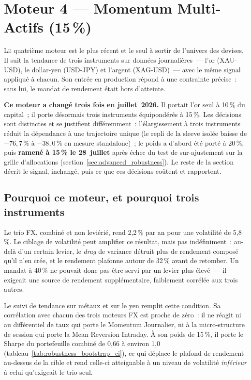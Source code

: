 \section{Moteur 4 --- Momentum Multi-Actifs (15\,\%)}
\label{sec:gold_momentum}

\lettrine[lines=2, findent=2pt, nindent=0pt]{L}{e} quatrième moteur est le plus récent et le seul à sortir de l'univers des devises. Il suit la tendance de trois instruments sur données journalières~--- l'or (XAU-USD), le dollar-yen (USD-JPY) et l'argent (XAG-USD)~--- avec le même signal appliqué à chacun. Son entrée en production répond à une contrainte précise~: sans lui, le mandat de rendement était hors d'atteinte.

\begin{insightbox}
\textbf{Ce moteur a changé trois fois en juillet~2026.} Il portait l'or seul à 10\,\% du capital~; il porte désormais trois instruments équipondérés à 15\,\%. Les décisions sont distinctes et se justifient différemment~: l'élargissement à trois instruments réduit la dépendance à une trajectoire unique (le repli de la sleeve isolée baisse de $-76{,}7\,\%$ à $-38{,}0\,\%$ en mesure standalone)~; le poids a d'abord été porté à 20\,\%, puis \textbf{ramené à 15\,\% le 28~juillet} après échec du test de sur-ajustement sur la grille d'allocations (section~\ref{sec:advanced_robustness}). Le reste de la section décrit le signal, inchangé, puis ce que ces décisions coûtent et rapportent.
\end{insightbox}

\subsection{Pourquoi ce moteur, et pourquoi trois instruments}

\begin{thesisbox}
Le trio FX, combiné et non leviérié, rend 2,2\,\% par an pour une volatilité de 5,8\,\%. Le ciblage de volatilité peut amplifier ce résultat, mais pas indéfiniment~: au-delà d'un certain levier, le \emph{drag} de variance détruit plus de rendement composé qu'il n'en crée, et le rendement plafonne autour de 32\,\% avant de retomber. Un mandat à 40\,\% ne pouvait donc pas être servi par un levier plus élevé~--- il exigeait une source de rendement supplémentaire, faiblement corrélée aux trois autres.
\end{thesisbox}

Le suivi de tendance sur métaux et sur le yen remplit cette condition. Sa corrélation avec chacun des trois moteurs FX est proche de zéro~: il ne réagit ni au différentiel de taux qui porte le Momentum Journalier, ni à la micro-structure de session qui porte la Mean Reversion Intraday. À son poids de 15\,\%, il porte le Sharpe du portefeuille combiné de 0,66 à environ 1,0 (tableau~\ref{tab:robustness_bootstrap_ci}), ce qui déplace le plafond de rendement au-dessus de la cible et rend celle-ci atteignable à un niveau de volatilité \emph{inférieur} à celui qu'exigeait le trio seul.

